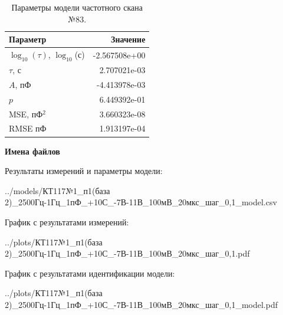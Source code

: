 \begin{table}[!ht]
    \centering
    \caption{Параметры модели частотного скана №83.}
    \begin{tabular}{|l|r|}
        \hline
        Параметр                                       & Значение                  \\ \hline
        $\log_{10}(\tau)$, $\log_{10}$(с)              & -2.567508e+00             \\ \hline
        $\tau$, с                                      & 2.707021e-03              \\ \hline
        $A$, пФ                                        & -4.413978e-03             \\ \hline
        $p$                                            & 6.449392e-01              \\ \hline
        MSE, пФ$^2$                                    & 3.660323e-08              \\ \hline
        RMSE пФ                                        & 1.913197e-04              \\ \hline
    \end{tabular}
    \label{table:frequency_scan_model_83}
\end{table}

\textbf{Имена файлов}

Результаты измерений и параметры модели:

\scriptsize../models/КТ117№1\_п1(база 2)\_2500Гц-1Гц\_1пФ\_+10С\_-7В-11В\_100мВ\_20мкс\_шаг\_0,1\_model.csv
\normalsize

График с результатами измерений:

\scriptsize../plots/КТ117№1\_п1(база 2)\_2500Гц-1Гц\_1пФ\_+10С\_-7В-11В\_100мВ\_20мкс\_шаг\_0,1.pdf
\normalsize

График с результатами идентификации модели:

\scriptsize../plots/КТ117№1\_п1(база 2)\_2500Гц-1Гц\_1пФ\_+10С\_-7В-11В\_100мВ\_20мкс\_шаг\_0,1\_model.pdf
\normalsize

